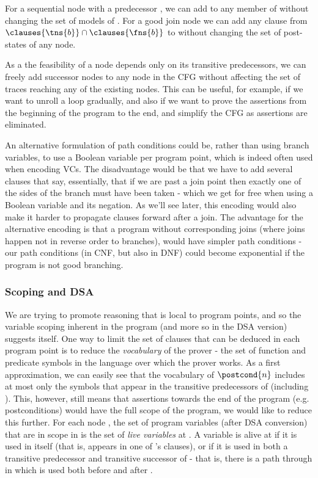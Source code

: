 For a sequential node  with a predecessor , we can add to  any member of  without changing the set of models of .
For a good join node  we can add any clause from $\clauses{\tns{b}} \cap \clauses{\fns{b}}$ to  without changing the set of post-states of any node.

As a the feasibility of a node depends only on its transitive predecessors, we can freely add successor nodes to any node in the CFG without affecting the set of traces reaching any of the existing nodes. This can be useful, for example, if we want to unroll a loop gradually, and also if we want to prove the assertions from the beginning of the program to the end, and simplify the CFG as assertions are eliminated.

An alternative formulation of path conditions could be, rather than using branch variables, to use a Boolean variable per program point, which is indeed often used when encoding VCs.
The disadvantage would be that we have to add several clauses that say, essentially, that if we are past a join point then exactly one of the sides of the branch must have been taken - which we get for free when using a Boolean variable and its negation. 
As we'll see later, this encoding would also make it harder to propagate clauses forward after a join.
The advantage for the alternative encoding is that a program without corresponding joins (where joins happen not in reverse order to branches), would have simpler path conditions - our path conditions (in CNF, but also in DNF) could become exponential if the program is not good branching.

\subsubsection{Scoping and DSA}
We are trying to promote reasoning that is local to program points, and so the variable scoping inherent in the program (and more so in the DSA version) suggests itself.
One way to limit the set of clauses that can be deduced in each program point is to reduce the \emph{vocabulary} of the prover - the set of function and predicate symbols in the language over which the prover works.
As a first approximation, we can easily see that the vocabulary of $\postcond{n}$ includes at most only the symbols that appear in the transitive predecessors of  (including ).
This, however, still means that assertions towards the end of the program (e.g. postconditions) would have the full scope of the program, we would like to reduce this further.
For each node , the set of program variables (after DSA conversion) that are in scope in  is the set of \emph{live variables} at .
A variable  is alive at  if it is used in  itself (that is, appears in one of 's clauses), or if it is used in both a transitive predecessor and transitive successor of  - that is, there is a path through  in which  is used both before and after .

